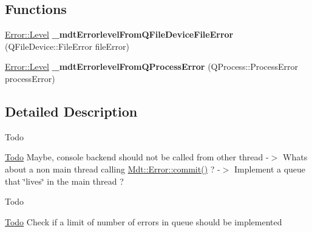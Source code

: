 \subsection*{Functions}
\begin{DoxyCompactItemize}
\item 
\hyperlink{class_mdt_1_1_error_ab533dc690f68a8635232db594194a068}{Error\+::\+Level} {\bfseries \+\_\+mdt\+Errorlevel\+From\+Q\+File\+Device\+File\+Error} (Q\+File\+Device\+::\+File\+Error file\+Error)\hypertarget{namespace_mdt_a257b45c35cbeebcdd09e848d0eb32a24}{}\label{namespace_mdt_a257b45c35cbeebcdd09e848d0eb32a24}

\item 
\hyperlink{class_mdt_1_1_error_ab533dc690f68a8635232db594194a068}{Error\+::\+Level} {\bfseries \+\_\+mdt\+Errorlevel\+From\+Q\+Process\+Error} (Q\+Process\+::\+Process\+Error process\+Error)\hypertarget{namespace_mdt_a695a2c868ea594d886deb671f1a12913}{}\label{namespace_mdt_a695a2c868ea594d886deb671f1a12913}

\end{DoxyCompactItemize}


\subsection{Detailed Description}
\begin{DoxyRefDesc}{Todo}
\item[\hyperlink{todo__todo000006}{Todo}]Maybe, console backend should not be called from other thread -\/$>$ What\textquotesingle{}s about a non main thread calling \hyperlink{class_mdt_1_1_error_a1b4a57bd4177d2985abd62b6b49a43f8}{Mdt\+::\+Error\+::commit()} ? -\/$>$ Implement a queue that \char`\"{}lives\char`\"{} in the main thread ? \end{DoxyRefDesc}


\begin{DoxyRefDesc}{Todo}
\item[\hyperlink{todo__todo000007}{Todo}]Check if a limit of number of errors in queue should be implemented \end{DoxyRefDesc}
